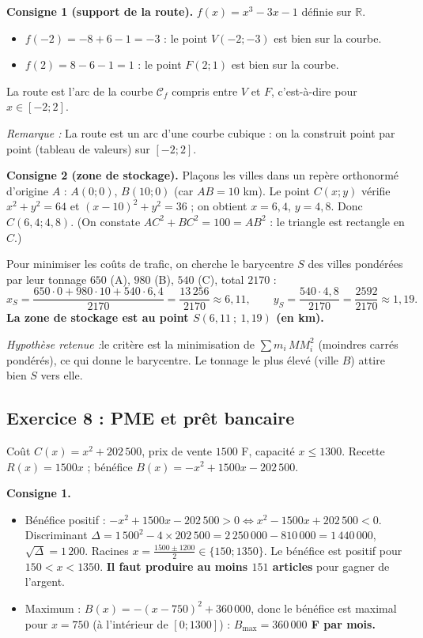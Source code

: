 \documentclass[11pt,a4paper]{article}
\newcommand{\R}{\mathbb{R}}
\newenvironment{rem}{\par\medskip\noindent\textit{Remarque :}\quad}{\par\medskip}
\newenvironment{hyp}{\par\medskip\noindent\textit{Hypoth\`ese retenue :}\quad}{\par\medskip}
\begin{document}
\textbf{Consigne 1 (support de la route).} $f(x)=x^3-3x-1$ d\'efinie sur $\R$.
\begin{itemize}
  \item $f(-2)=-8+6-1=-3$ : le point $V(-2;-3)$ est bien sur la courbe.
  \item $f(2)=8-6-1=1$ : le point $F(2;1)$ est bien sur la courbe.
\end{itemize}
La route est l'arc de la courbe $\mathcal C_f$ compris entre $V$ et $F$, c'est-\`a-dire pour $x\in[-2;2]$.
\begin{rem} La route est un arc d'une courbe cubique : on la construit point par point (tableau de valeurs) sur $[-2;2]$.\end{rem}

\medskip\noindent\textbf{Consigne 2 (zone de stockage).} Plaçons les villes dans un rep\`ere orthonormé d'origine $A$ :
$A(0;0)$, $B(10;0)$ (car $AB=10$ km). Le point $C(x;y)$ v\'erifie $x^2+y^2=64$ et $(x-10)^2+y^2=36$ ; on obtient $x=6{,}4$, $y=4{,}8$.
Donc $C(6{,}4;4{,}8)$. (On constate $AC^2+BC^2=100=AB^2$ : le triangle est rectangle en $C$.)

Pour minimiser les co\^uts de trafic, on cherche le barycentre $S$ des villes pond\'er\'ees par leur tonnage
$650$ (A), $980$ (B), $540$ (C), total $2170$ :
\[
x_S=\frac{650\cdot0+980\cdot10+540\cdot6{,}4}{2170}=\frac{13\,256}{2170}\approx 6{,}11,\qquad
y_S=\frac{540\cdot4{,}8}{2170}=\frac{2592}{2170}\approx 1{,}19.
\]
\textbf{La zone de stockage est au point $S(6{,}11\ ;\ 1{,}19)$ (en km).}
\begin{hyp}le crit\`ere est la minimisation de $\sum m_i\,MM_i^2$ (moindres carr\'es pond\'er\'es), ce qui donne le barycentre.
Le tonnage le plus \'elev\'e (ville $B$) attire bien $S$ vers elle.\end{hyp}

\subsection{Exercice 8 : PME et pr\^et bancaire}

Co\^ut $C(x)=x^2+202\,500$, prix de vente $1500$ F, capacit\'e $x\le1300$.
Recette $R(x)=1500x$ ; b\'en\'efice $B(x)=-x^2+1500x-202\,500$.

\textbf{Consigne 1.}
\begin{itemize}
  \item B\'en\'efice positif : $-x^2+1500x-202\,500>0\iff x^2-1500x+202\,500<0$.
  Discriminant $\Delta=1\,500^2-4\times202\,500=2\,250\,000-810\,000=1\,440\,000$, $\sqrt\Delta=1\,200$.
  Racines $x=\frac{1500\pm1200}{2}\in\{150;1350\}$. Le b\'en\'efice est positif pour $150<x<1350$.
  \textbf{Il faut produire au moins $151$ articles} pour gagner de l'argent.
  \item Maximum : $B(x)=-(x-750)^2+360\,000$, donc le b\'en\'efice est maximal pour $x=750$ (\`a l'int\'erieur de $[0;1300]$) :
  \textbf{$B_{\max}=360\,000$ F par mois.}
\end{itemize}
\end{document}
